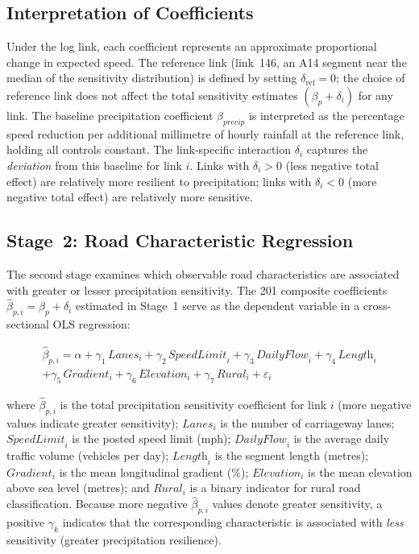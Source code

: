 \documentclass[review,authoryear]{elsarticle}
\begin{document}
\subsection{Interpretation of Coefficients}
\label{sec:method:interpret}

Under the log link, each coefficient represents an approximate proportional change in expected speed. The reference link (link~146, an A14 segment near the median of the sensitivity distribution) is defined by setting $\delta_{\text{ref}} = 0$; the choice of reference link does not affect the total sensitivity estimates $(\beta_p + \delta_i)$ for any link. The baseline precipitation coefficient $\beta_{\textit{precip}}$ is interpreted as the percentage speed reduction per additional millimetre of hourly rainfall at the reference link, holding all controls constant. The link-specific interaction $\delta_i$ captures the \textit{deviation} from this baseline for link $i$. Links with $\delta_i > 0$ (less negative total effect) are relatively more resilient to precipitation; links with $\delta_i < 0$ (more negative total effect) are relatively more sensitive.

\subsection{Stage~2: Road Characteristic Regression}
\label{sec:method:stage2}

The second stage examines which observable road characteristics are associated with greater or lesser precipitation sensitivity. The 201 composite coefficients $\hat{\beta}_{p,i} = \beta_p + \delta_i$ estimated in Stage~1 serve as the dependent variable in a cross-sectional OLS regression:

\begin{multline}
\label{eq:stage2}
\hat{\beta}_{p,i} = \alpha + \gamma_1 \, \textit{Lanes}_i + \gamma_2 \, \textit{SpeedLimit}_i + \gamma_3 \, \textit{DailyFlow}_i + \gamma_4 \, \textit{Length}_i \\
+ \gamma_5 \, \textit{Gradient}_i + \gamma_6 \, \textit{Elevation}_i + \gamma_7 \, \textit{Rural}_i + \varepsilon_i
\end{multline}

\noindent where $\hat{\beta}_{p,i}$ is the total precipitation sensitivity coefficient for link $i$ (more negative values indicate greater sensitivity); $\textit{Lanes}_i$ is the number of carriageway lanes; $\textit{SpeedLimit}_i$ is the posted speed limit (\si{mph}); $\textit{DailyFlow}_i$ is the average daily traffic volume (vehicles per day); $\textit{Length}_i$ is the segment length (metres); $\textit{Gradient}_i$ is the mean longitudinal gradient (\%); $\textit{Elevation}_i$ is the mean elevation above sea level (metres); and $\textit{Rural}_i$ is a binary indicator for rural road classification. Because more negative $\hat{\beta}_{p,i}$ values denote greater sensitivity, a positive $\gamma_k$ indicates that the corresponding characteristic is associated with \textit{less} sensitivity (greater precipitation resilience).
\end{document}
